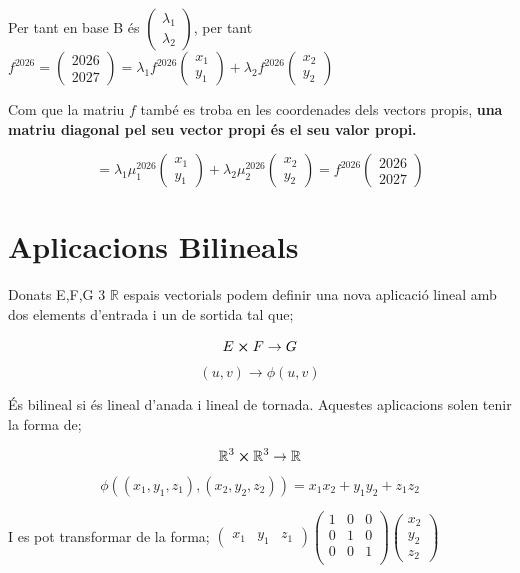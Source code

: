 \documentclass[12pt]{article}
\newcommand{\R}{\mathbb{R}}
\begin{document}
Per tant en base B és $ \begin{pmatrix}
    \lambda_1\\
    \lambda_2
\end{pmatrix}$, per tant $f^{2026}=\begin{pmatrix}
    2026\\
    2027
\end{pmatrix} = \lambda_1 f^{2026}  \begin{pmatrix}
    x_1\\
    y_1
\end{pmatrix} + \lambda_2 f^{2026} \begin{pmatrix}
    x_2\\
    y_2
\end{pmatrix}$

Com que la matriu $f$ també es troba en les coordenades dels vectors propis, \textbf{una matriu diagonal pel seu vector propi és el seu valor propi.}

\[= \lambda_1 \mu_1^{2026} \begin{pmatrix}
    x_1\\
    y_1
    \end{pmatrix} + \lambda_2 \mu_2^{2026} \begin{pmatrix}
    x_2\\
    y_2
    \end{pmatrix} = f^{2026}\begin{pmatrix}
        2026\\
        2027
    \end{pmatrix}
\]

\section{Aplicacions Bilineals}

Donats E,F,G 3 $\R$ espais vectorials podem definir una nova aplicació lineal amb dos elements d'entrada i un de sortida tal que;

\[E \cross F \rightarrow G\]
\[(u,v) \rightarrow \phi (u,v)\]

És bilineal si és lineal d'anada i lineal de tornada. Aquestes aplicacions solen tenir la forma de;

\[\R^3 \cross \R^3 \rightarrow \R\]
\[\phi((x_1,y_1,z_1),(x_2,y_2,z_2)) = x_1x_2+y_1y_2+z_1z_2\]

I es pot transformar de la forma; $\begin{pmatrix}
    x_1 & y_1 & z_1
\end{pmatrix}\begin{pmatrix}
    1 & 0 & 0\\ 0 & 1 & 0\\ 0 & 0 & 1\\
\end{pmatrix}\begin{pmatrix}
    x_2 \\y_2 \\ z_2
\end{pmatrix}$
\end{document}
